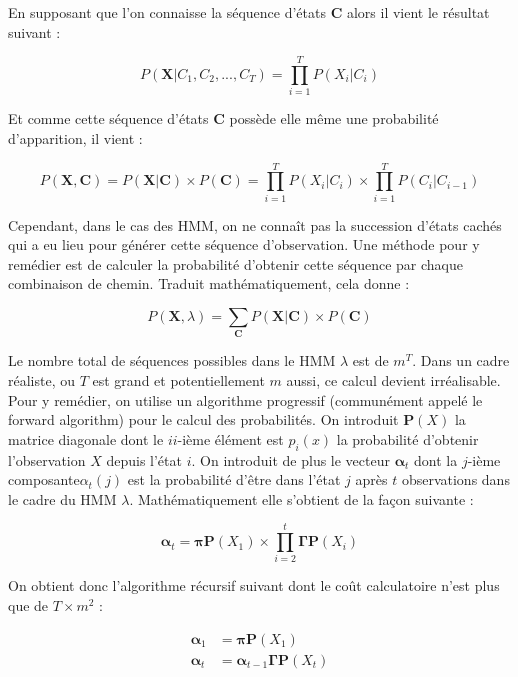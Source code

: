 \documentclass[12pt, french]{report}
\begin{document}
En supposant que l'on connaisse la séquence d'états $\bm{C}$ alors il vient le résultat suivant :

\begin{equation}
P(\bm{X}|C_1,C_2,...,C_T) = \prod\limits_{i=1}^T P(X_i|C_i)
\end{equation}

Et comme cette séquence d'états $\bm{C}$ possède elle même une probabilité d'apparition, il vient :

\begin{equation}
P(\bm{X},\bm{C}) = P(\bm{X}|\bm{C}) \times P(\bm{C}) =   \prod\limits_{i=1}^T P(X_i|C_i) \times \prod \limits_{i=1}^T P(C_i|C_{i-1})
\end{equation}

Cependant, dans le cas des HMM, on ne connaît pas la succession d'états cachés qui a eu lieu pour générer cette séquence d'observation. Une méthode pour y remédier est de calculer la probabilité d'obtenir cette séquence par chaque combinaison de chemin. Traduit mathématiquement, cela donne :

\begin{equation}
P(\bm{X},\lambda) =\sum\limits_{\bm{C}} P(\bm{X}|\bm{C}) \times P(\bm{C}) 
\end{equation}

Le nombre total de séquences possibles dans le HMM $\lambda$ est de $m^T$. Dans un cadre réaliste, ou $T$ est grand et potentiellement $m$ aussi, ce calcul devient irréalisable. Pour y remédier, on utilise un algorithme progressif (communément appelé le forward algorithm) pour le calcul des probabilités. On introduit $\bm{P}(X)$ la matrice diagonale dont le $ii$-ième élément est $p_i(x)$ la probabilité d'obtenir l'observation $X$ depuis l'état $i$. On introduit de plus le vecteur $\bm{\alpha}_t$ dont la $j$-ième composante$ \alpha_t(j)$ est la probabilité d'être dans l'état $j$ après $t$ observations dans le cadre du HMM $\lambda$. Mathématiquement elle s'obtient de la façon suivante : 

\begin{equation}
\bm{\alpha}_t = \bm{\pi} \bm{P}(X_1) \times \prod\limits_{i=2}^t \bm{\Gamma}\bm{P}(X_i)
\end{equation}

On obtient donc l'algorithme récursif suivant dont le coût calculatoire n'est plus que de $T \times m^2$ :

\begin{align} 
\label{eq::HMM:ForwardAlgo}
\bm{\alpha}_1 &= \bm{\pi} \bm{P}(X_1) \\ 
\bm{\alpha}_t &= \bm{\alpha}_{t-1} \bm{\Gamma} \bm{P}(X_t)
\end{align}
\end{document}
